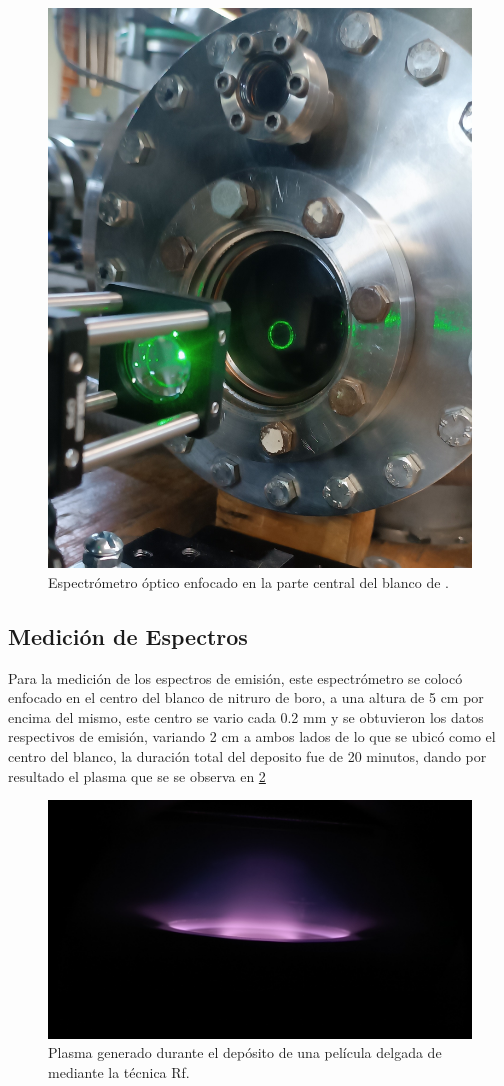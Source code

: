 \documentclass[12pt]{IEEEtran}
\begin{document}
\begin{figure}[htp]
	\centering
	\includegraphics[width=0.6\linewidth]{figs/buenaaaaaaaaa.jpg}
	\caption{Espectrómetro óptico enfocado en la parte central del blanco de .}
	\label{fig:Espectometro}
\end{figure}

\subsection{Medición de Espectros}

Para la medición de los espectros de emisión, este espectrómetro se colocó enfocado en el centro del blanco de nitruro de boro, a una altura de 5 cm por encima del mismo, este centro se vario cada 0.2 mm y se obtuvieron los datos respectivos de emisión, variando 2 cm a ambos lados de lo que se ubicó como el centro del blanco, la duración total del deposito fue de 20 minutos, dando por resultado el plasma que se se observa en \ref{fig:plasma}

\begin{figure}[htp]
	\centering
	\includegraphics[width=0.8\linewidth]{PLASMA.jpg}
	\caption{Plasma generado durante el depósito de una película delgada de  mediante la técnica Rf.}
	\label{fig:plasma}
\end{figure}
\end{document}
